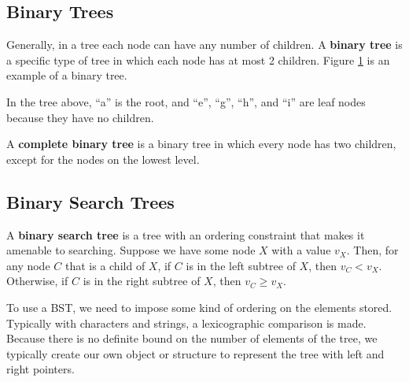 \subsection{Binary Trees}
Generally, in a tree each node can have any number of children. A \textbf{binary tree} is a specific type of tree in which each node has at most 2 children. Figure \ref{fig:tree1} is an example of a binary tree. 

\begin{figure}[h]
\centering
{}
\label{fig:tree1}
\end{figure}

In the tree above, “a” is the root, and “e”, “g”, “h”, and “i” are leaf nodes because they have no children. 

A \textbf{complete binary tree} is a binary tree in which every node has two children, except for the nodes on the lowest level.



\subsection{Binary Search Trees}

A \textbf{binary search tree} is a tree with an ordering constraint that makes it amenable to searching. Suppose we have some node $X$ with a value $v_X$. Then, for any node $C$ that is a child of $X$, if $C$ is in the left subtree of $X$, then $v_C < v_X$. Otherwise, if $C$ is in the right subtree of $X$, then $v_C \geq v_X$.

To use a BST, we need to impose some kind of ordering on the elements stored. Typically with characters and strings, a lexicographic comparison is made. Because there is no definite bound on the number of elements of the tree, we typically create our own object or structure to represent the tree with left and right pointers.

